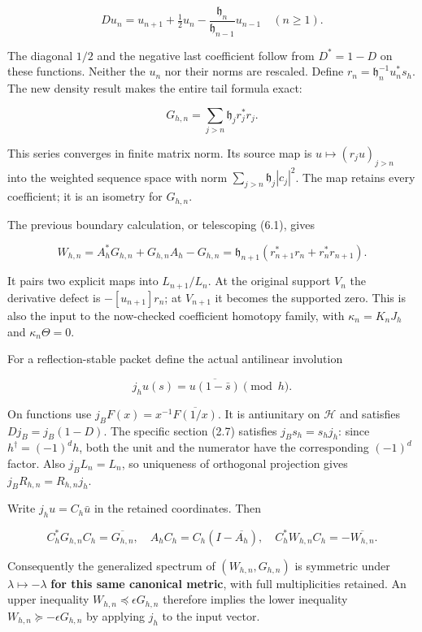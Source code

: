 \documentclass[
]{article}
\begin{document}
\[Du_n=u_{n+1}+\tfrac12u_n-\frac{\mathfrak h_n}{\mathfrak h_{n-1}}u_{n-1}\quad(n\ge1).\tag{6.1}\]

The diagonal \(1/2\) and the negative last coefficient follow from
\(D^*=1-D\) on these functions. Neither the \(u_n\) nor their norms are
rescaled. Define \(r_n=\mathfrak h_n^{-1}u_n^*s_h\). The new density
result makes the entire tail formula exact:

\[\boxed{G_{h,n}=\sum_{j>n}\mathfrak h_j r_j^*r_j.}\tag{6.2}\]

This series converges in finite matrix norm. Its source map is
\(u\mapsto(r_j u)_{j>n}\) into the weighted sequence space with norm
\(\sum_{j>n}\mathfrak h_j|c_j|^2\). The map retains every coefficient;
it is an isometry for \(G_{h,n}\).

The previous boundary calculation, or telescoping (6.1), gives

\[\boxed{W_{h,n}=A_h^*G_{h,n}+G_{h,n}A_h-G_{h,n}
=\mathfrak h_{n+1}(r_{n+1}^*r_n+r_n^*r_{n+1}).}\tag{6.3}\]

It pairs two explicit maps into \(L_{n+1}/L_n\). At the original support
\(V_n\) the derivative defect is \(-[u_{n+1}]r_n\); at \(V_{n+1}\) it
becomes the supported zero. This is also the input to the now-checked
coefficient homotopy family, with \(\kappa_n=K_nJ_h\) and
\(\kappa_n\Theta=0\).

For a reflection-stable packet define the actual antilinear involution

\[j_hu(s)=\overline{u(1-\bar s)}\pmod h.\]

On functions use \(j_BF(x)=x^{-1}\overline{F(1/x)}\). It is antiunitary
on \(\mathcal H\) and satisfies \(Dj_B=j_B(1-D)\). The specific section
(2.7) satisfies \(j_Bs_h=s_hj_h\): since \(h^\dagger=(-1)^dh\), both the
unit and the numerator have the corresponding \((-1)^d\) factor. Also
\(j_BL_n=L_n\), so uniqueness of orthogonal projection gives
\(j_BR_{h,n}=R_{h,n}j_h\).

Write \(j_hu=C_h\bar u\) in the retained coordinates. Then

\[\boxed{C_h^*G_{h,n}C_h=\overline{G_{h,n}},\quad
A_hC_h=C_h(I-\overline{A_h}),\quad
C_h^*W_{h,n}C_h=-\overline{W_{h,n}}.}\tag{6.4}\]

Consequently the generalized spectrum of \((W_{h,n},G_{h,n})\) is
symmetric under \(\lambda\mapsto-\lambda\) \textbf{for this same
canonical metric}, with full multiplicities retained. An upper
inequality \(W_{h,n}\preceq\epsilon G_{h,n}\) therefore implies the
lower inequality \(W_{h,n}\succeq-\epsilon G_{h,n}\) by applying \(j_h\)
to the input vector.
\end{document}
